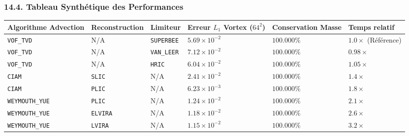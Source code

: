 \documentclass[
  french,
]{article}
\newcounter{none} %
\begin{document}
\subsubsection{14.4. Tableau Synthétique des
Performances}\label{tableau-synthuxe9tique-des-performances}

{\def\LTcaptype{none} %
\begin{longtable}[]{@{}
  >{\raggedright\arraybackslash}p{}
  >{\raggedright\arraybackslash}p{}
  >{\raggedright\arraybackslash}p{}
  >{\raggedright\arraybackslash}p{}
  >{\raggedright\arraybackslash}p{}
  >{\raggedright\arraybackslash}p{}@{}}
\toprule\noalign{}
\begin{minipage}[b]{\linewidth}\raggedright
Algorithme Advection
\end{minipage} & \begin{minipage}[b]{\linewidth}\raggedright
Reconstruction
\end{minipage} & \begin{minipage}[b]{\linewidth}\raggedright
Limiteur
\end{minipage} & \begin{minipage}[b]{\linewidth}\raggedright
Erreur \(L_1\) Vortex (\(64^2\))
\end{minipage} & \begin{minipage}[b]{\linewidth}\raggedright
Conservation Masse
\end{minipage} & \begin{minipage}[b]{\linewidth}\raggedright
Temps relatif
\end{minipage} \\
\midrule\noalign{}
\endhead
\bottomrule\noalign{}
\endlastfoot
\texttt{VOF\_TVD} & N/A & \texttt{SUPERBEE} & \(5.69 \times 10^{-2}\) &
\(100.000\%\) & \(1.0\times\) (Référence) \\
\texttt{VOF\_TVD} & N/A & \texttt{VAN\_LEER} & \(7.12 \times 10^{-2}\) &
\(100.000\%\) & \(0.98\times\) \\
\texttt{VOF\_TVD} & N/A & \texttt{HRIC} & \(6.04 \times 10^{-2}\) &
\(100.000\%\) & \(1.05\times\) \\
\texttt{CIAM} & \texttt{SLIC} & N/A & \(2.41 \times 10^{-2}\) &
\(100.000\%\) & \(1.4\times\) \\
\texttt{CIAM} & \texttt{PLIC} & N/A & \(6.23 \times 10^{-3}\) &
\(100.000\%\) & \(1.8\times\) \\
\texttt{WEYMOUTH\_YUE} & \texttt{PLIC} & N/A & \(1.24 \times 10^{-2}\) &
\(100.000\%\) & \(2.1\times\) \\
\texttt{WEYMOUTH\_YUE} & \texttt{ELVIRA} & N/A & \(1.18 \times 10^{-2}\)
& \(100.000\%\) & \(2.6\times\) \\
\texttt{WEYMOUTH\_YUE} & \texttt{LVIRA} & N/A & \(1.15 \times 10^{-2}\)
& \(100.000\%\) & \(3.2\times\) \\
\end{longtable}
}
\end{document}
